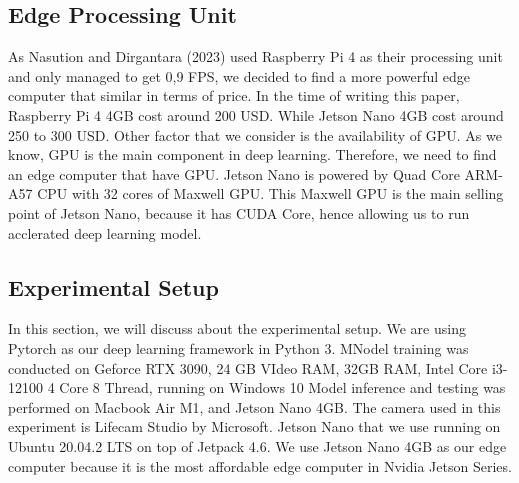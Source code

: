 \documentclass[conference]{IEEEtran}
\begin{document}
\subsection{Edge Processing Unit}
As Nasution and Dirgantara (2023) used Raspberry Pi 4 as their processing unit and only managed to get 0,9 FPS, we decided to find a more powerful edge computer that similar in terms of price. In the time of writing this paper, Raspberry Pi 4 4GB cost around 200 USD. While Jetson Nano 4GB cost around 250 to 300 USD.
Other factor that we consider is the availability of GPU. As we know, GPU is the main component in deep learning. Therefore, we need to find an edge computer that have GPU.
Jetson Nano is powered by Quad Core ARM-A57 CPU with 32 cores of Maxwell GPU. This Maxwell GPU is the main selling point of Jetson Nano, because it has CUDA Core, hence allowing us to run acclerated deep learning model.

\subsection{Experimental Setup}
In this section, we will discuss about the experimental setup. We are using Pytorch as our deep learning framework in Python  3.
MNodel training was conducted on Geforce RTX 3090, 24 GB VIdeo RAM, 32GB RAM, Intel Core i3-12100 4 Core 8 Thread, running on Windows 10
Model inference and testing was performed on Macbook Air M1, and Jetson Nano 4GB. The camera used in this experiment is Lifecam Studio by Microsoft.
Jetson Nano that we use running on Ubuntu 20.04.2 LTS on top of Jetpack 4.6. We use Jetson Nano 4GB as our edge computer because it is the most affordable edge computer in Nvidia Jetson Series.
\end{document}
